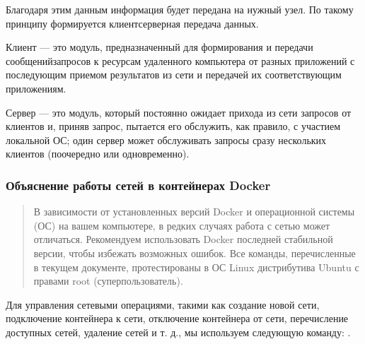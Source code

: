 \documentclass[letterpaper,10pt,russian]{sphinxmanual}
\begin{document}
\begin{sphinxVerbatim}[commandchars=\\\{\}]
   
 
 

   
 
 
 
   
\end{sphinxVerbatim}

\sphinxAtStartPar
Благодаря этим данным информация будет передана на нужный узел. По такому принципу формируется клиент\sphinxhyphen{}серверная передача данных.

\sphinxAtStartPar
Клиент — это модуль, предназначенный для формирования и передачи сообщений\sphinxhyphen{}запросов к ресурсам удаленного компьютера от разных приложений с последующим приемом результатов из сети и передачей их соответствующим приложениям.

\sphinxAtStartPar
Сервер — это модуль, который постоянно ожидает прихода из сети запросов от клиентов и, приняв запрос, пытается его обслужить, как правило, с участием локальной ОС; один сервер может обслуживать запросы сразу нескольких клиентов (поочередно или одновременно).

\sphinxAtStartPar
{}


\subsubsection{Объяснение работы сетей в контейнерах Docker}
\label{\detokenize{educational_materials/docker_network/content:id4}}\begin{quote}

\sphinxAtStartPar
В зависимости от установленных версий Docker и операционной системы (ОС) на вашем компьютере, в редких случаях работа с сетью может отличаться. Рекомендуем использовать Docker последней стабильной версии, чтобы избежать возможных ошибок. Все команды, перечисленные в текущем документе, протестированы в ОС Linux дистрибутива Ubuntu с правами root (суперпользователь).
\end{quote}

\sphinxAtStartPar
Для управления сетевыми операциями, такими как создание новой сети, подключение контейнера к сети, отключение контейнера от сети, перечисление доступных сетей, удаление сетей и т. д., мы используем следующую команду: .
\end{document}
